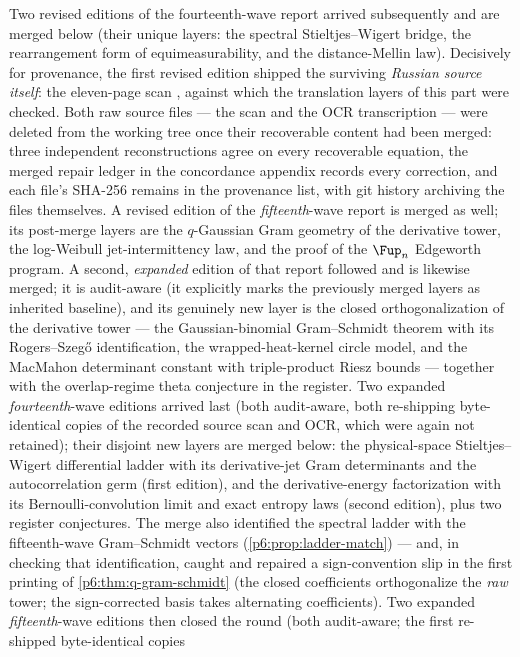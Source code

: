 \documentclass[11pt,oneside]{article}
\numberwithin{equation}{section}
\theoremstyle{definition}
\theoremstyle{remark}
\begin{document}
\begin{scopebox}
Two revised editions of the fourteenth-wave report arrived subsequently and
are merged below (their unique layers: the spectral Stieltjes--Wigert bridge,
the rearrangement form of equimeasurability, and the distance-Mellin law).
Decisively for provenance, the first revised edition shipped the surviving
\emph{Russian source itself}: the eleven-page scan
, against which the translation layers of this
part were checked.  Both raw source files --- the scan and the OCR
transcription --- were deleted from the working tree once their recoverable
content had been merged: three independent reconstructions agree on every
recoverable equation, the merged repair ledger in the concordance appendix
records every correction, and each file's SHA-256 remains in the provenance
list, with git history archiving the files themselves.  A revised edition of
the \emph{fifteenth}-wave report is merged
as well; its post-merge layers are the $q$-Gaussian Gram geometry of the
derivative tower, the log-Weibull jet-intermittency law, and the proof of
the $\Fup_n$ Edgeworth program.  A second, \emph{expanded} edition of that
report followed and is likewise merged; it is audit-aware (it explicitly
marks the previously merged layers as inherited baseline), and its genuinely
new layer is the closed orthogonalization of the derivative tower --- the
Gaussian-binomial Gram--Schmidt theorem with its Rogers--Szeg\H{o}
identification, the wrapped-heat-kernel circle model, and the MacMahon
determinant constant with triple-product Riesz bounds --- together with the
overlap-regime theta conjecture in the register.  Two expanded
\emph{fourteenth}-wave editions arrived last (both audit-aware, both
re-shipping byte-identical copies of the recorded source scan and OCR,
which were again not retained); their disjoint new layers are merged below:
the physical-space Stieltjes--Wigert differential ladder with its
derivative-jet Gram determinants and the autocorrelation germ (first
edition), and the derivative-energy factorization with its
Bernoulli-convolution limit and exact entropy laws (second edition), plus
two register conjectures.  The merge also identified the spectral ladder
with the fifteenth-wave Gram--Schmidt vectors
(\cref{p6:prop:ladder-match}) --- and, in checking that identification,
caught and repaired a sign-convention slip in the first printing of
\cref{p6:thm:q-gram-schmidt} (the closed coefficients orthogonalize the
\emph{raw} tower; the sign-corrected basis takes alternating
coefficients).  Two expanded \emph{fifteenth}-wave editions then closed
the round (both audit-aware; the first re-shipped byte-identical copies

\end{scopebox}
\end{document}
